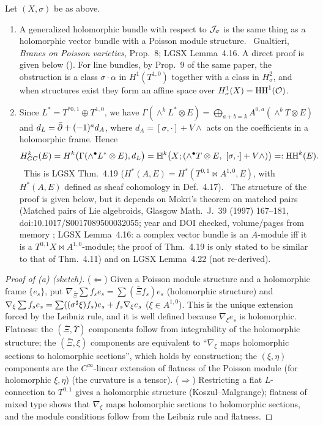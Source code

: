 \begin{prop}[Generalized holomorphic bundles $=$ Poisson modules, and the Dolbeault model]\label{p1:prop:ident}
Let $(X,\sigma)$ be as above.
\begin{enumerate}
\item[(a)] A generalized holomorphic bundle with respect to $\mathcal J_\sigma$ is the same thing as a holomorphic vector bundle with a Poisson module structure. \tC\ Gualtieri, \emph{Branes on Poisson varieties}, Prop.~8; LGSX Lemma~4.16. A direct proof is given below (\tP). For line bundles, by Prop.~9 of the same paper, the obstruction is a class $\sigma\cdot\alpha$ in $H^1(T^{1,0})$ together with a class in $H^2_\sigma$, and when structures exist they form an affine space over $H^1_\sigma(X)=\mathrm{HH}^1(\mathcal O)$. \tC
\item[(b)] Since $L^*=T^{*0,1}\oplus T^{1,0}$, we have $\Gamma(\wedge^kL^*\otimes E)=\bigoplus_{a+b=k}A^{0,a}(\wedge^bT\otimes E)$ and $d_L=\bar\partial+(-1)^ad_A$, where $d_A=[\sigma,\cdot]+V\wedge$ acts on the coefficients in a holomorphic frame. Hence
\[H^k_{GC}(E)=H^k\bigl(\Gamma(\wedge^\bullet L^*\otimes E),d_L\bigr)=\mathbb H^k\bigl(X;(\wedge^\bullet T\otimes E,\ [\sigma,\cdot]+V\wedge)\bigr)=:\HH^k(E).\]
\tC\ This is LGSX Thm.~4.19 ($H^*(A,E)=H^*(T^{0,1}\bowtie A^{1,0},E)$, with $H^*(A,E)$ defined as sheaf cohomology in Def.~4.17). \tP\ The structure of the proof is given below, but it depends on Mokri's theorem on matched pairs (Matched pairs of Lie algebroids, Glasgow Math.\ J.\ 39 (1997) 167--181, doi:10.1017/S0017089500032055; year and DOI checked, volume/pages from memory \tQ; LGSX Lemma~4.16: a complex vector bundle is an $A$-module iff it is a $T^{0,1}X\bowtie A^{1,0}$-module; the proof of Thm.~4.19 is only stated to be similar to that of Thm.~4.11) and on LGSX Lemma~4.22 (not re-derived).
\end{enumerate}
\end{prop}
\begin{proof}[Proof of (a) (sketch)]
($\Leftarrow$) Given a Poisson module structure and a holomorphic frame $\{e_s\}$, put $\nabla_{\bar\Xi}\sum f_se_s=\sum(\bar\Xi f_s)e_s$ (holomorphic structure) and $\nabla_\xi\sum f_se_s=\sum((\sigma^\sharp\xi)f_s)e_s+f_s\nabla_\xi e_s$ ($\xi\in A^{1,0}$). This is the unique extension forced by the Leibniz rule, and it is well defined because $\nabla_\xi e_s$ is holomorphic. Flatness: the $(\bar\Xi,\bar\Upsilon)$ components follow from integrability of the holomorphic structure; the $(\bar\Xi,\xi)$ components are equivalent to ``$\nabla_\xi$ maps holomorphic sections to holomorphic sections'', which holds by construction; the $(\xi,\eta)$ components are the $C^\infty$-linear extension of flatness of the Poisson module (for holomorphic $\xi,\eta$) (the curvature is a tensor).
($\Rightarrow$) Restricting a flat $L$-connection to $T^{0,1}$ gives a holomorphic structure (Koszul--Malgrange); flatness of mixed type shows that $\nabla_\xi$ maps holomorphic sections to holomorphic sections, and the module conditions follow from the Leibniz rule and flatness.\qedhere
\end{proof}
